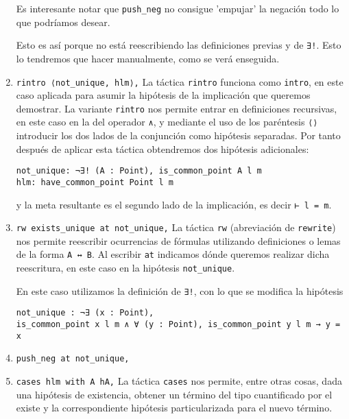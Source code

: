 \begin{enumerate}[label=L.\arabic*, topsep=0mm]
	      Es interesante notar que \lstinline{push_neg} no consigue 'empujar' la negación todo lo que podríamos desear.

	      Esto es así porque no está reescribiendo las definiciones previas y de
	      \lstinline{∃!}. Esto lo tendremos que hacer manualmente, como se verá
	      enseguida.

	\item \lstinline{rintro ⟨not_unique, hlm⟩,} La táctica \lstinline{rintro}
	      funciona como \lstinline{intro}, en este caso aplicada para asumir la
	      hipótesis de la implicación que queremos demostrar. La variante
	      \lstinline{rintro} nos permite entrar en definiciones recursivas, en este
	      caso en la del operador \lstinline{∧}, y mediante el uso de los paréntesis
	      \lstinline{⟨⟩} introducir los dos lados de la conjunción como hipótesis
	      separadas. Por tanto después de aplicar esta táctica obtendremos dos
	      hipótesis adicionales:
	      \begin{lstlisting}
not_unique: ¬∃! (A : Point), is_common_point A l m
hlm: have_common_point Point l m
\end{lstlisting}
	      y la meta resultante es el segundo lado de la implicación, es decir
	      \lstinline{⊢ l = m}.

	\item \lstinline{rw exists_unique at not_unique,}  La táctica \lstinline{rw}
	      (abreviación de \lstinline{rewrite}) nos permite reescribir ocurrencias de
	      fórmulas utilizando definiciones o lemas de la forma \lstinline{A ↔ B}. Al
	      escribir \lstinline{at} indicamos dónde queremos realizar dicha
	      reescritura, en este caso en la hipótesis \lstinline{not_unique}.

	      En este caso utilizamos la definición de \lstinline{∃!}, con lo que se modifica la hipótesis
	      \begin{lstlisting}
not_unique : ¬∃ (x : Point), 
is_common_point x l m ∧ ∀ (y : Point), is_common_point y l m → y = x
\end{lstlisting}

	\item \lstinline{push_neg at not_unique,}

	\item \lstinline{cases hlm with A hA,} La táctica \lstinline{cases} nos
	      permite, entre otras cosas, dada una hipótesis de existencia, obtener un
	      término del tipo cuantificado por el existe y la correspondiente hipótesis
	      particularizada para el nuevo término.


\end{enumerate}
